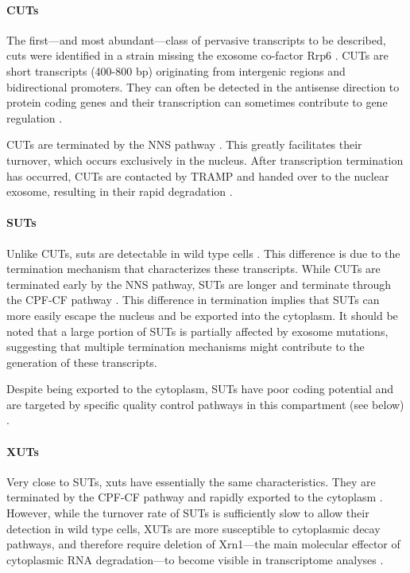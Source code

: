 \paragraph{CUTs}

The first—and most abundant—class of pervasive transcripts to be described, \gls{cuts} were identified in a strain missing the exosome co-factor Rrp6 \cite{wyers:2005:cryptic}. 
CUTs are short transcripts (400-800 bp) originating from intergenic regions and bidirectional promoters.
They can often be detected in the antisense direction to protein coding genes and their transcription can sometimes contribute to gene regulation \cite{arigo:2006:termination}. 

CUTs are terminated by the NNS pathway \cite{arigo:2006:regulation}. 
This greatly facilitates their turnover, which occurs exclusively in the nucleus. 
After transcription termination has occurred, CUTs are contacted by TRAMP and handed over to the nuclear exosome, resulting in their rapid degradation \cite{thiebaut:2006:transcription}.

\paragraph{SUTs}

Unlike CUTs, \gls{suts} are detectable in wild type cells \cite{david:2006:highresolution}. 
This difference is due to the termination mechanism that characterizes these transcripts. While CUTs are terminated early by the NNS pathway, SUTs are longer and terminate through the CPF-CF pathway \cite{marquardt:2011:distinct}. 
This difference in termination implies that SUTs can more easily escape the nucleus and be exported into the cytoplasm. 
It should be noted that a large portion of SUTs is partially affected by exosome mutations, suggesting that multiple termination mechanisms might contribute to the generation of these transcripts. 

Despite being exported to the cytoplasm, SUTs have poor coding potential and are targeted by specific quality control pathways in this compartment (see below) \cite{malabat:2015:quality}.

\paragraph{XUTs}

Very close to SUTs, \gls{xuts} have essentially the same characteristics.
They are terminated by the CPF-CF pathway and rapidly exported to the cytoplasm \cite{vandijk:2011:xuts}. 
However, while the turnover rate of SUTs is sufficiently slow to allow their detection in wild type cells, XUTs are more susceptible to cytoplasmic decay pathways, and therefore require deletion of Xrn1—the main molecular effector of cytoplasmic RNA degradation—to become visible in transcriptome analyses \cite{vandijk:2011:xuts}.


